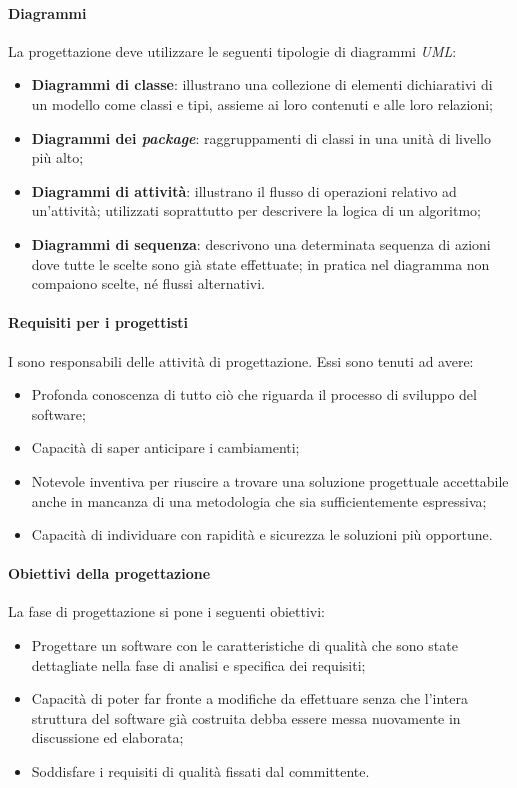\paragraph{Diagrammi}
La progettazione deve utilizzare le seguenti tipologie di diagrammi \textit{UML}:
\begin{itemize}
\item
\textbf{Diagrammi di classe}: illustrano una collezione di elementi dichiarativi di un modello come classi e tipi, assieme ai loro contenuti e alle loro relazioni;
\item
\textbf{Diagrammi dei \textit{package}}: raggruppamenti di classi in una unità di livello più alto;
\item
\textbf{Diagrammi di attività}: illustrano il flusso di operazioni relativo ad un'attività; utilizzati soprattutto per descrivere la logica di un algoritmo;
\item
\textbf{Diagrammi di sequenza}: descrivono una determinata sequenza di azioni dove tutte le scelte sono già state effettuate; in pratica nel diagramma non compaiono scelte, né flussi alternativi.
\end{itemize}


\paragraph{Requisiti per i progettisti}

I \textit{\Progs} sono responsabili delle attività di progettazione. Essi sono tenuti ad avere:
\begin{itemize}
\item
Profonda conoscenza di tutto ciò che riguarda il processo di sviluppo del software;
\item
Capacità di saper anticipare i cambiamenti;
\item
Notevole inventiva per riuscire a trovare una soluzione progettuale accettabile anche in mancanza di una metodologia che sia sufficientemente espressiva;
\item
Capacità di individuare con rapidità e sicurezza le soluzioni più opportune.
\end{itemize}

\paragraph{Obiettivi della progettazione}
La fase di progettazione si pone i seguenti obiettivi:
\begin{itemize}
\item
Progettare un software con le caratteristiche di qualità che sono state dettagliate nella fase di analisi e specifica dei requisiti;
\item
Capacità di poter far fronte a modifiche da effettuare senza che l'intera struttura del software già costruita debba essere messa nuovamente in discussione ed elaborata;
\item
Soddisfare i requisiti di qualità fissati dal committente.
\end{itemize}

